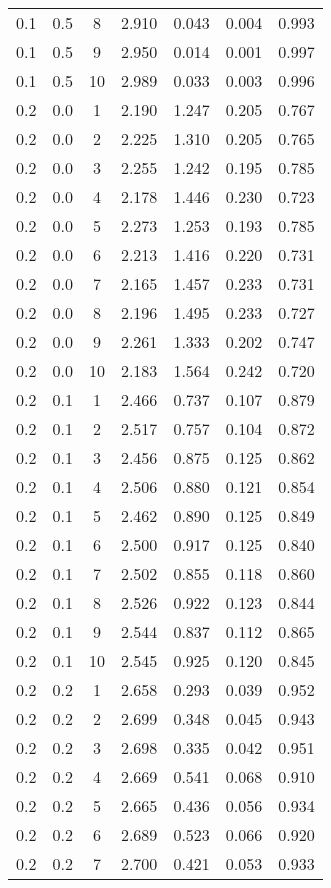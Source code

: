 \begin{tabular}{|c|c|c|c|c|c|c|}
0.1 & 0.5 & 8 & 2.910 & 0.043 & 0.004 & 0.993 \\
0.1 & 0.5 & 9 & 2.950 & 0.014 & 0.001 & 0.997 \\
0.1 & 0.5 & 10 & 2.989 & 0.033 & 0.003 & 0.996 \\
0.2 & 0.0 & 1 & 2.190 & 1.247 & 0.205 & 0.767 \\
0.2 & 0.0 & 2 & 2.225 & 1.310 & 0.205 & 0.765 \\
0.2 & 0.0 & 3 & 2.255 & 1.242 & 0.195 & 0.785 \\
0.2 & 0.0 & 4 & 2.178 & 1.446 & 0.230 & 0.723 \\
0.2 & 0.0 & 5 & 2.273 & 1.253 & 0.193 & 0.785 \\
0.2 & 0.0 & 6 & 2.213 & 1.416 & 0.220 & 0.731 \\
0.2 & 0.0 & 7 & 2.165 & 1.457 & 0.233 & 0.731 \\
0.2 & 0.0 & 8 & 2.196 & 1.495 & 0.233 & 0.727 \\
0.2 & 0.0 & 9 & 2.261 & 1.333 & 0.202 & 0.747 \\
0.2 & 0.0 & 10 & 2.183 & 1.564 & 0.242 & 0.720 \\
0.2 & 0.1 & 1 & 2.466 & 0.737 & 0.107 & 0.879 \\
0.2 & 0.1 & 2 & 2.517 & 0.757 & 0.104 & 0.872 \\
0.2 & 0.1 & 3 & 2.456 & 0.875 & 0.125 & 0.862 \\
0.2 & 0.1 & 4 & 2.506 & 0.880 & 0.121 & 0.854 \\
0.2 & 0.1 & 5 & 2.462 & 0.890 & 0.125 & 0.849 \\
0.2 & 0.1 & 6 & 2.500 & 0.917 & 0.125 & 0.840 \\
0.2 & 0.1 & 7 & 2.502 & 0.855 & 0.118 & 0.860 \\
0.2 & 0.1 & 8 & 2.526 & 0.922 & 0.123 & 0.844 \\
0.2 & 0.1 & 9 & 2.544 & 0.837 & 0.112 & 0.865 \\
0.2 & 0.1 & 10 & 2.545 & 0.925 & 0.120 & 0.845 \\
0.2 & 0.2 & 1 & 2.658 & 0.293 & 0.039 & 0.952 \\
0.2 & 0.2 & 2 & 2.699 & 0.348 & 0.045 & 0.943 \\
0.2 & 0.2 & 3 & 2.698 & 0.335 & 0.042 & 0.951 \\
0.2 & 0.2 & 4 & 2.669 & 0.541 & 0.068 & 0.910 \\
0.2 & 0.2 & 5 & 2.665 & 0.436 & 0.056 & 0.934 \\
0.2 & 0.2 & 6 & 2.689 & 0.523 & 0.066 & 0.920 \\
0.2 & 0.2 & 7 & 2.700 & 0.421 & 0.053 & 0.933 \\

\end{tabular}
